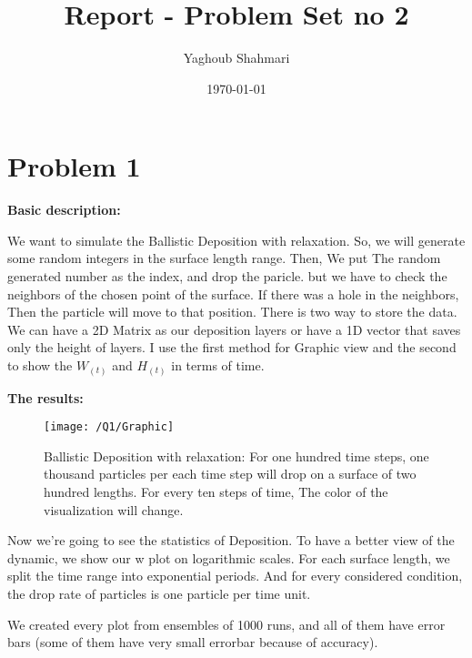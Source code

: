 \documentclass{article}
\author{Yaghoub Shahmari}
\title{Report - Problem Set no 2}
\date{\today}
\begin{document}
    \maketitle
    \section*{Problem 1}
    \textbf{Basic description:}

    We want to simulate the Ballistic Deposition with relaxation.
    So, we will generate some random integers in the surface length range.
    Then, We put The random generated number as the index, and drop the paricle.
    but we have to check the neighbors of the chosen point of the surface.
    If there was a hole in the neighbors, Then the particle will move to that position.
    There is two way to store the data. We can have a 2D Matrix as our deposition layers or have a 1D vector that saves only the height of layers.
    I use the first method for Graphic view and the second to show the $W_{(t)}$ and $H_{(t)}$ in terms of time.

    \textbf{The results:}

    \begin{figure}[!htb]
        \centering
        \texttt{[image: /Q1/Graphic]}
        \label{fig:1.1}
        \caption{Ballistic Deposition with relaxation:
        For one hundred time steps, one thousand particles per each time step will drop on a surface of two hundred lengths.
        For every ten steps of time, The color of the visualization will change.}
    \end{figure}

    \pagebreak

    Now we're going to see the statistics of Deposition.
    To have a better view of the dynamic,
    we show our w plot on logarithmic scales.
    For each surface length, we split the time range into exponential periods.
    And for every considered condition, the drop rate of particles is one particle per time unit.

    We created every plot from ensembles of 1000 runs,
    and all of them have error bars
    (some of them have very small errorbar because of accuracy).
\end{document}
